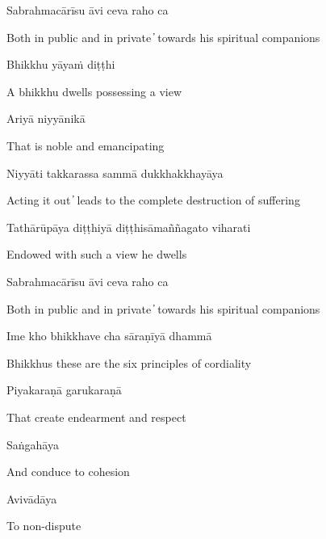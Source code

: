 Sabrahmacārīsu āvi ceva raho ca

\begin{cprenglish}
Both in public and in private  ̓  towards his spiritual companions
\end{cprenglish}

Bhikkhu yāyaṁ diṭṭhi

\begin{cprenglish}
A bhikkhu dwells possessing a view
\end{cprenglish}

Ariyā niyyānikā

\begin{cprenglish}
That is noble and emancipating
\end{cprenglish}

Niyyāti takkarassa sammā dukkhakkhayāya

\begin{cprenglish}
Acting it out  ̓  leads to the complete destruction of suffering
\end{cprenglish}

Tathārūpāya diṭṭhiyā diṭṭhisāmaññagato viharati

\begin{cprenglish}
Endowed with such a view he dwells
\end{cprenglish}

Sabrahmacārīsu āvi ceva raho ca

\begin{cprenglish}
Both in public and in private  ̓  towards his spiritual companions
\end{cprenglish}

Ime kho bhikkhave cha sāraṇīyā dhammā

\begin{cprenglish}
Bhikkhus these are the six principles of cordiality
\end{cprenglish}

Piyakaraṇā garukaraṇā

\begin{cprenglish}
That create endearment and respect
\end{cprenglish}

Saṅgahāya

\begin{cprenglish}
And conduce to cohesion
\end{cprenglish}

Avivādāya

\begin{cprenglish}
To non-dispute
\end{cprenglish}

